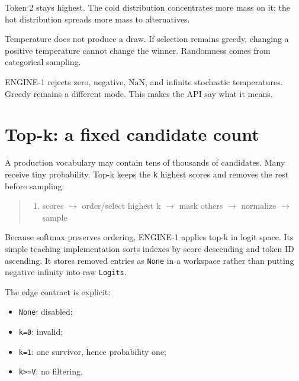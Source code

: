 Token 2 stays highest. The cold distribution concentrates more mass on
it; the hot distribution spreads more mass to alternatives.


Temperature does not produce a draw. If selection remains greedy,
changing a positive temperature cannot change the winner. Randomness
comes from categorical sampling.

ENGINE-1 rejects zero, negative, NaN, and infinite stochastic
temperatures. Greedy remains a different mode. This makes the API say
what it means.

\section{Top-k: a fixed candidate
count}\label{top-k-a-fixed-candidate-count}

A production vocabulary may contain tens of thousands of candidates.
Many receive tiny probability. Top-k keeps the \texttt{k} highest scores
and removes the rest before sampling:

\begin{quote}
\begin{enumerate}
\item scores  \(\longrightarrow\)  order/select highest k  \(\longrightarrow\)  mask others  \(\longrightarrow\)  normalize  \(\longrightarrow\)  sample
\end{enumerate}
\end{quote}

Because softmax preserves ordering, ENGINE-1 applies top-k in logit
space. Its simple teaching implementation sorts indexes by score
descending and token ID ascending. It stores removed entries as
\texttt{None} in a workspace rather than putting negative infinity into
raw \texttt{Logits}.

The edge contract is explicit:

\begin{itemize}
\tightlist
\item
  \texttt{None}: disabled;
\item
  \texttt{k=0}: invalid;
\item
  \texttt{k=1}: one survivor, hence probability one;
\item
  \texttt{k\textgreater{}=V}: no filtering.
\end{itemize}

